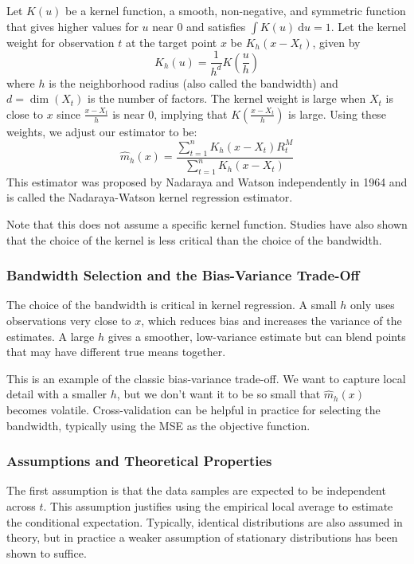 Let $K(u)$ be a kernel function, a smooth, non-negative, and symmetric function that gives higher values for $u$ near 0 and satisfies $\int K(u)\ \mathrm{d}u=1$. Let the kernel weight for observation $t$ at the target point $x$ be $K_h(x-X_t)$, given by $$K_h(u)=\frac{1}{h^d}K\left(\frac{u}{h}\right)$$ where $h$ is the neighborhood radius (also called the bandwidth) and $d=\dim(X_t)$ is the number of factors. The kernel weight is large when $X_t$ is close to $x$ since $\frac{x-X_t}{h}$ is near 0, implying that $K\left(\frac{x-X_t}{h}\right)$ is large. Using these weights, we adjust our estimator to be: $$\hat{m}_h(x)=\frac{\sum_{t=1}^nK_h(x-X_t)R_t^M}{\sum_{t=1}^nK_h(x-X_t)}$$ This estimator was proposed by Nadaraya and Watson independently in 1964 and is called the Nadaraya-Watson kernel regression estimator.\cite{nadaraya, watson}

Note that this does not assume a specific kernel function. Studies have also shown that the choice of the kernel is less critical than the choice of the bandwidth.

\subsubsection{Bandwidth Selection and the Bias-Variance Trade-Off}

The choice of the bandwidth is critical in kernel regression. A small $h$ only uses observations very close to $x$, which reduces bias and increases the variance of the estimates. A large $h$ gives a smoother, low-variance estimate but can blend points that may have different true means together. 

This is an example of the classic bias-variance trade-off. We want to capture local detail with a smaller $h$, but we don't want it to be so small that $\hat{m}_h(x)$ becomes volatile. Cross-validation can be helpful in practice for selecting the bandwidth, typically using the MSE as the objective function.

\subsubsection{Assumptions and Theoretical Properties}

The first assumption is that the data samples are expected to be independent across $t$. This assumption justifies using the empirical local average to estimate the conditional expectation. Typically, identical distributions are also assumed in theory, but in practice a weaker assumption of stationary distributions has been shown to suffice.

